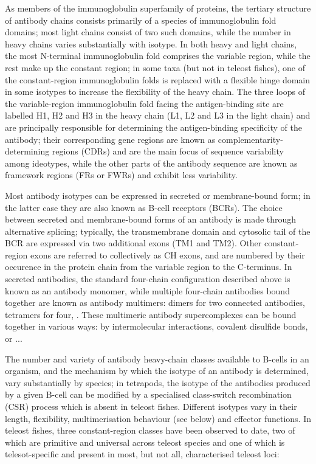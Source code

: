 As members of the immunoglobulin superfamily of proteins, the tertiary structure of antibody chains consists primarily of a species of immunoglobulin fold domains; most light chains consist of two such domains, while the number in heavy chains varies substantially with isotype. In both heavy and light chains, the most N-terminal immunoglobulin fold comprises the variable region, while the rest make up the constant region; in some taxa (but not in teleost fishes), one of the constant-region immunoglobulin folds is replaced with a flexible hinge domain in some isotypes to increase the flexibility of the heavy chain. The three loops of the variable-region immunoglobulin fold facing the antigen-binding site are labelled H1, H2 and H3 in the heavy chain (L1, L2 and L3 in the light chain) and are principally responsible for determining the antigen-binding specificity of the antibody; their corresponding gene regions are known as complementarity-determining regions (CDRs) and are the main focus of sequence variability among ideotypes, while the other parts of the antibody sequence are known as framework regions (FRs or FWRs) and exhibit less variability.

Most antibody isotypes can be expressed in secreted or membrane-bound form; in the latter case they are also known as B-cell receptors (BCRs). The choice between secreted and membrane-bound forms of an antibody is made through alternative splicing; typically, the transmembrane domain and cytosolic tail of the BCR are expressed via two additional exons (TM1 and TM2). Other constant-region exons are referred to collectively as CH exons, and are numbered by their occurence in the protein chain from the variable region to the C-terminus. In secreted antibodies, the standard four-chain configuration described above is known as an antibody monomer, while multiple four-chain antibodies bound together are known as antibody multimers: dimers for two connected antibodies, tetramers for four, \etc. These multimeric antibody supercomplexes can be bound together in various ways: by intermolecular interactions, covalent disulfide bonds, or ... %

The number and variety of antibody heavy-chain classes available to B-cells in an organism, and the mechanism by which the isotype of an antibody is determined, vary substantially by species; in tetrapods, the isotype of the antibodies produced by a given B-cell can be modified by a specialised class-switch recombination (CSR) process which is absent in teleost fishes. Different isotypes vary in their length, flexibility, multimerisation behaviour (see below) and effector functions. In teleost fishes, three constant-region classes have been observed to date, two of which are primitive and universal across teleost species and one of which is telesot-specific and present in most, but not all, characterised teleost \igh{} loci:

